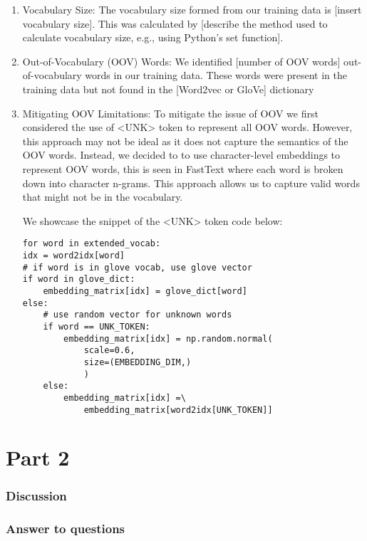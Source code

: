 \documentclass{article}
\begin{document}
\begin{enumerate}
  \item Vocabulary Size: The vocabulary size formed from our training data is [insert
            vocabulary size]. This was calculated by [describe the method used to calculate
            vocabulary size, e.g., using Python's set function].

  \item Out-of-Vocabulary (OOV) Words: We identified [number of OOV words]
        out-of-vocabulary words in our training data. These words were present in the
        training data but not found in the [Word2vec or GloVe] dictionary

  \item Mitigating OOV Limitations: To mitigate the issue of OOV we first considered
        the use of <UNK> token to represent all OOV words. However, this approach may
        not be ideal as it does not capture the semantics of the OOV words. Instead, we
        decided to to use character-level embeddings to represent OOV words, this is
        seen in FastText where each word is broken down into character n-grams. This
        approach allows us to capture valid words that might not be in the vocabulary.

        We showcase the snippet of the <UNK> token code below:

\begin{verbatim}
for word in extended_vocab:
idx = word2idx[word]
# if word is in glove vocab, use glove vector
if word in glove_dict:
    embedding_matrix[idx] = glove_dict[word]
else:
    # use random vector for unknown words
    if word == UNK_TOKEN:
        embedding_matrix[idx] = np.random.normal(
            scale=0.6,
            size=(EMBEDDING_DIM,)
            )
    else:
        embedding_matrix[idx] =\
            embedding_matrix[word2idx[UNK_TOKEN]]
\end{verbatim}

\end{enumerate}

\section*{Part 2}

\subsubsection*{Discussion}

\subsubsection*{Answer to questions}
\end{document}
